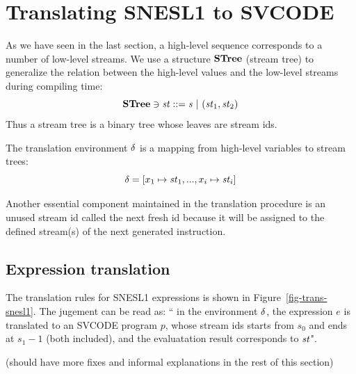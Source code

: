 \section{Translating SNESL1 to SVCODE}
As we have seen in the last section, a high-level sequence corresponds to a number of low-level streams.
We use a structure $\mathbf{STree}$ (stream tree) to generalize the relation between the high-level values and the low-level streams during compiling time:
$$ \STree \ni \st ::= \s \ | \ (\st_1,\st_2) $$
Thus a stream tree is a binary tree whose leaves are stream ids.  

The translation environment $\delta$ is a mapping from high-level variables to stream trees:
 $$\del = [x_1 \|-> \st_1,..., x_i \|-> {\st_i}] $$ 

Another essential component maintained in the translation procedure is an unused stream id called the next fresh id because it will be assigned to the defined stream(s) of the next generated instruction.

\subsection{Expression translation}

%	
The translation rules for SNESL1 expressions is shown in Figure~\ref{fig-trans-snesl1}. 
The jugement can be read as: `` in the environment $\delta$, the expression $e$ is translated to an SVCODE program $p$, whose stream ids starts from $s_0$ and ends at $s_1-1$ (both included), and the evaluatation result corresponds to $\mathit{st}$". 


(should have more fixes and informal explanations in the rest of this section)

